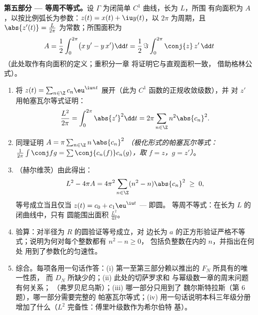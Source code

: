 \begin{problem}
\medskip
\noindent\textbf{第五部分 --- 等周不等式。}设
$\Gamma$ 为闭简单 $C^1$ 曲线，长为 $L$，所围
有向面积为 $A$，以按比例弧长为参数：$z(t) =
x(t) + \iu y(t)$，以 $2\pi$ 为周期，且 $\abs{z'(t)} =
\frac{L}{2\pi}$ 为常数；所围面积为
\[
A = \frac12\int_0^{2\pi}\bigl(x\,y' - y\,x'\bigr)\dd t
= \frac{1}{2}\,\Im\int_0^{2\pi}\conj{z}\,z'\,\dd t
\]
（此处取作有向面积的定义；重积分一章
将证明它与直观面积一致，
借助格林公式）。
\begin{enumerate}[resume]
  \item 将 $z(t) = \sum_{n\in\Z}c_n\eu^{\iu nt}$ 展开（此为
        $C^1$ 函数的正规收敛级数），并
        对 $z'$ 用帕塞瓦尔等式证明：
        \[
        \frac{L^2}{2\pi} = \int_0^{2\pi}\abs{z'}^2\dd t
        = 2\pi\sum_{n\in\Z}n^2\abs{c_n}^2 .
        \]
  \item 同理证明 $A = \pi\sum_{n\in\Z}
        n\,\abs{c_n}^2$ \emph{（极化形式的帕塞瓦尔等式：
        $\frac{1}{2\pi}\int\conj f g = \sum
        \conj{c_n(f)}c_n(g)$，取 $f = z$，$g = z'$）}。
  \item （赫尔维茨）由此得出：
        \[
        L^2 - 4\pi A = 4\pi^2\sum_{n\in\Z}
        (n^2 - n)\abs{c_n}^2 \;\geq\; 0 ,
        \]
        等号成立当且仅当 $z(t) = c_0 +
        c_1\eu^{\iu t}$ --- 即圆。
        等周不等式：在长为 $L$ 的闭曲线中，只有
        圆能围出面积 $\frac{L^2}{4\pi}$。
  \item 验算：对半径为
        $R$ 的圆验证等号成立，对
        边长为 $a$ 的正方形验证严格不等式；说明为何对每个整数都有 $n^2 - n \geq 0$，
        包括负整数在内的 $n$，并指出在何处
        用到了参数化的匀速性。
  \item 综合。每项各用一句话作答：(i) 第一至第三部分赖以推出的
        $F_N$ 所具有的唯一性质，
        而 $D_N$ 所缺少的；(ii) 此处的切萨罗求和
        与幂级数一章的周末问题有何关系；
        （弗罗贝尼乌斯）；(iii) 哪一部分只用到了
        魏尔斯特拉斯（第 6 题），哪一部分需要完整的
        帕塞瓦尔等式；(iv) 用一句话说明本科三年级分册
        增加了什么（$L^2$ 完备性：傅里叶级数作为希尔伯特
        基）。
\end{enumerate}
\end{problem}
